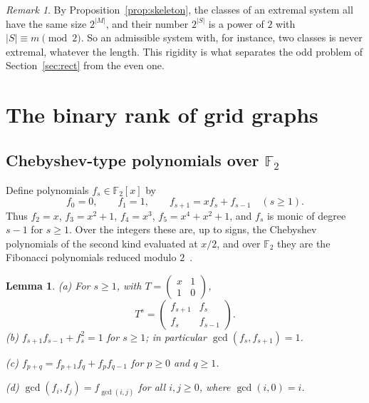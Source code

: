 \documentclass[11pt]{amsart}
\newtheorem{lemma}[theorem]{Lemma}
\theoremstyle{definition}
\theoremstyle{remark}
\newtheorem{remark}[theorem]{Remark}
\numberwithin{equation}{section}
\newcommand{\F}{\mathbb{F}}
\begin{document}
\begin{remark}\label{rem:classsizes}
By Proposition~\ref{prop:skeleton}, the classes of an extremal system all have the same size $2^{|M|}$, and their number $2^{|S|}$ is a power of $2$ with $|S|\equiv m\pmod2$. So an admissible system with, for instance, two classes is never extremal, whatever the length. This rigidity is what separates the odd problem of Section~\ref{sec:rect} from the even one.
\end{remark}

\section{The binary rank of grid graphs}\label{sec:rank}

\subsection{Chebyshev-type polynomials over $\F_2$}

Define polynomials $f_s\in\F_2[x]$ by
\[
f_0=0,\qquad f_1=1,\qquad f_{s+1}=x f_s+f_{s-1}\quad(s\ge1).
\]
Thus $f_2=x$, $f_3=x^2+1$, $f_4=x^3$, $f_5=x^4+x^2+1$, and $f_s$ is monic of degree $s-1$ for $s\ge1$. Over the integers these are, up to signs, the Chebyshev polynomials of the second kind evaluated at $x/2$, and over $\F_2$ they are the Fibonacci polynomials reduced modulo $2$~\cite{HL,Sutner00}.

\begin{lemma}\label{lem:fib}
\textup{(a)} For $s\ge1$, with $T=\begin{pmatrix}x&1\\1&0\end{pmatrix}$,
\[
T^s=\begin{pmatrix}f_{s+1}&f_s\\ f_s&f_{s-1}\end{pmatrix}.
\]
\textup{(b)} $f_{s+1}f_{s-1}+f_s^2=1$ for $s\ge1$; in particular $\gcd(f_s,f_{s+1})=1$.

\textup{(c)} $f_{p+q}=f_{p+1}f_q+f_pf_{q-1}$ for $p\ge0$ and $q\ge1$.

\textup{(d)} $\gcd(f_i,f_j)=f_{\gcd(i,j)}$ for all $i,j\ge0$, where $\gcd(i,0)=i$.
\end{lemma}
\end{document}
